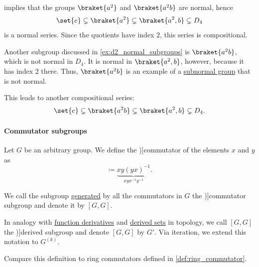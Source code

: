 \begin{example}
\begin{thmenum}
     implies that the groups \( \braket{ a^2 } \) and \( \braket{ a^2 b } \) are normal, hence
    \begin{equation}\label{eq:ex:def:normal_series/subnormal}
      \set{ e } \subsetneq \braket{ a^2 } \subsetneq \braket{ a^2, b } \subsetneq D_4
    \end{equation}
    is a normal series. Since the quotients have index \( 2 \), this series is compositional.

    Another subgroup discussed in \cref{ex:d2_normal_subgroups} is \( \braket{ a^2 b } \), which is not normal in \( D_4 \). It is normal in \( \braket{ a^2, b } \), however, because it has index \( 2 \) there. Thus, \( \braket{ a^2 b } \) is an example of a \hyperref[def:subnormal_group]{subnormal group} that is not normal.

    This leads to another compositional series:
    \begin{equation}
      \set{ e } \subsetneq \braket{ a^2 b } \subsetneq \braket{ a^2, b } \subsetneq D_4.
    \end{equation}
  \end{thmenum}
\end{example}

\paragraph{Commutator subgroups}

\begin{definition}\label{def:group_commutator}
  Let \( G \) be an arbitrary group. We define the \term[ru=коммутатор (\cite[37]{Кострикин2020АлгебраЧасть3})]{commutator} of the elements \( x \) and \( y \) as
  \begin{equation*}
    [x, y] \coloneqq \underbrace{xy(yx)^{-1}}_{xyx^{-1}y^{-1}}.
  \end{equation*}

  We call the subgroup \hyperref[def:group/subobject]{generated} by all the commutators in \( G \) the \term[ru=коммутант (группы) (\cite[37]{Кострикин2020АлгебраЧасть3})]{commutator subgroup} and denote it by \( [G, G] \).

  In analogy with \hyperref[def:differentiability]{function derivatives} and \hyperref[def:derived_set]{derived sets} in topology, we call \( [G, G] \) the \term[ru=производная подгруппа (\cite[37]{Кострикин2020АлгебраЧасть3})]{derived subgroup} and denote \( [G, G] \) by \( G' \). Via iteration, we extend this notation to \( G^{(k)} \).
\end{definition}
\begin{comments}
  \item Compare this definition to ring commutators defined in \cref{def:ring_commutator}.
\end{comments}

